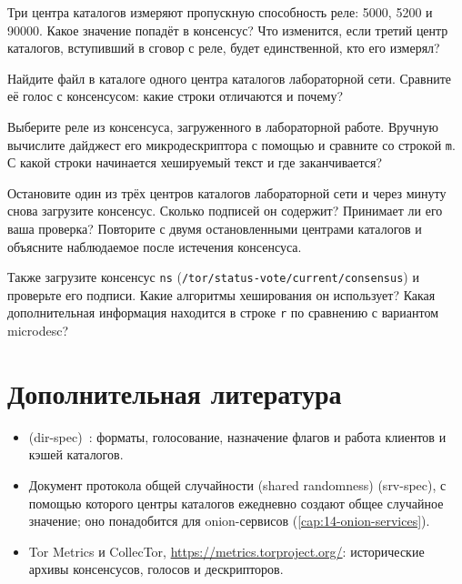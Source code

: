 \begin{esercizio}[2]\label{es:12-mediana}
Три центра каталогов измеряют пропускную способность реле: 5000, 5200 и 90000. Какое значение попадёт в консенсус? Что изменится, если третий центр каталогов, вступивший в сговор с реле, будет единственной, кто его измерял?
\end{esercizio}

\begin{esercizio}[2]\label{es:12-voti}
Найдите файл  в каталоге одного центра каталогов лабораторной сети. Сравните её голос с консенсусом: какие строки отличаются и почему?
\end{esercizio}

\begin{esercizio}[2]\label{es:12-md}
Выберите реле из консенсуса, загруженного в лабораторной работе. Вручную вычислите дайджест его микродескриптора с помощью  и сравните со строкой \texttt{m}. С какой строки начинается хешируемый текст и где заканчивается?
\end{esercizio}

\begin{esercizio}[3]\label{es:12-autorita}
Остановите один из трёх центров каталогов лабораторной сети и через минуту снова загрузите консенсус. Сколько подписей он содержит? Принимает ли его ваша проверка? Повторите с двумя остановленными центрами каталогов и объясните наблюдаемое после истечения консенсуса.
\end{esercizio}

\begin{esercizio}[3]\label{es:12-ns}
Также загрузите консенсус \texttt{ns} (\nolinkurl{/tor/status-vote/current/consensus}) и проверьте его подписи. Какие алгоритмы хеширования он использует? Какая дополнительная информация находится в строке \texttt{r} по сравнению с вариантом microdesc?
\end{esercizio}

\section*{Дополнительная литература}
\begin{itemize}
  \item {} (dir-spec)~\cite{torspec}: форматы, голосование, назначение флагов и работа клиентов и кэшей каталогов.
  \item Документ протокола общей случайности (shared randomness) (srv-spec), с помощью которого центры каталогов ежедневно создают общее случайное значение; оно понадобится для onion-сервисов (\cref{cap:14-onion-services}).
  \item Tor Metrics и CollecTor, \url{https://metrics.torproject.org/}: исторические архивы консенсусов, голосов и дескрипторов.
\end{itemize}
